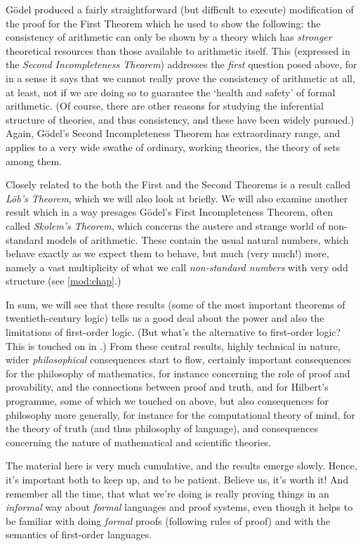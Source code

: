 G\"odel  produced a fairly straightforward (but difficult to execute)
modification of the proof  for the First Theorem which he used to show
the following: the consistency of arithmetic can only be shown by a
theory which has \emph{stronger} theoretical resources than those
available to arithmetic itself. This (expressed in the \emph{Second
Incompleteness Theorem}) addresses the \emph{first} question posed
above, for in a sense it says that we cannot really prove the
consistency of arithmetic at all, at least, not  if we are doing so to
guarantee the `health and safety' of formal arithmetic.  (Of course,
there are other reasons for studying the inferential structure of
theories, and thus consistency, and these have been widely pursued.)
Again, G\"odel's Second Incompleteness Theorem   has extraordinary
range, and applies to a very wide swathe of ordinary, working
theories, the theory of sets among them. 

Closely related to the both the First and the Second Theorems is a
result called \emph{L\"ob's Theorem}, which we will also look at
briefly. We will also examine another result which in a way presages
G\"odel's First Incompleteness Theorem, often called \emph{Skolem's
Theorem}, which concerns the austere and strange world of non-standard
models of arithmetic. These contain the usual natural numbers, which
behave exactly as we expect them to behave, but much (very much!{})
more,  namely a vast multiplicity of what we call \emph{non-standard
numbers} with very odd structure (see \cref{mod:chap}.) 

In sum, we will see that these results (some of the most important
theorems of  twentieth-century logic) tells us a good deal about the
power and also the limitations of first-order logic. (But what's the
alternative to first-order logic? This is touched on in
.) From  these central results, highly
technical in nature, wider \emph{philosophical} consequences start to
flow, certainly important consequences for the philosophy of
mathematics, for instance concerning  the role of proof and
provability, and the connections between proof and truth, and for
Hilbert's programme, some of which we touched on above, but also
consequences for philosophy more generally, for instance for the
computational theory of mind, for the theory of truth (and thus
philosophy of language), and consequences concerning the nature of
mathematical and scientific theories. 

\bigskip

\noindent The material here is very much cumulative, and the results
emerge slowly. Hence, it's important both to keep up, and to be
patient. Believe us, it's worth it!{} And remember all the time, that
what we're doing is really proving things in an \emph{informal} way
about \emph{formal} languages and proof systems, even though it helps
to be familiar with doing \emph{formal} proofs (following rules of
proof) and with the semantics of first-order languages. 

